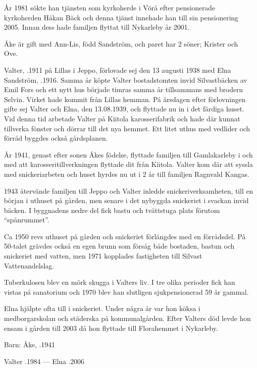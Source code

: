 År 1981 sökte han tjänsten som kyrkoherde i Vörå efter pensionerade kyrkoherden Håkan Bäck och denna tjänst innehade han till sin pensionering 2005. Innan dess hade familjen flyttat till Nykarleby år 2001.

Åke är gift med Ann-Lis, född Sandström, och paret har 2 söner;	Krister och Ove.


Valter, .1911 på Lillas i Jeppo, förlovade sej den 13 augusti 1938 med Elna Sandström, .1916. Samma år köpte Valter bostadstomten invid Silvastbäcken av Emil Fors och ett nytt hus började timras samma år tillsammans med brodern Selvin. Virket hade kommit från Lillas hemman. På årsdagen efter förlovningen gifte sej Valter och Elna, den 13.08.1939, och flyttade nu in i det färdiga huset. Vid denna tid arbetade Valter på Kiitola karosserifabrik och hade där kunnat tillverka fönster och dörrar till det nya hemmet. Ett litet uthus med vedlider och förråd byggdes också gårdsplanen.

År 1941, genast efter sonen Åkes födelse, flyttade familjen till Gamlakarleby i och med att karosseritillverkningen flyttade dit från Kiitola. Valter kom där att syssla med snickeriarbeten och huset hyrdes nu ut i 2 år till familjen Ragnvald Kangas.

1943 återvände familjen till Jeppo och Valter inledde snickeriverksamheten, till en början i uthuset på gården, men senare i det nybyggda snickeriet i svackan invid bäcken. I byggnadens nedre del fick bastu och tvättstuga plats förutom ``spånrummet''.

Ca 1950 revs uthuset på gården och snickeriet förlängdes med en förrådsdel. På 50-talet grävdes också en egen brunn som försåg både bostaden, bastun och snickeriet med vatten, men 1971 kopplades fastigheten till Silvast Vattenandelslag.

Tuberkulosen blev en mörk skugga i Valters liv. I tre olika perioder fick han vistas på sanatorium och 1970 blev han slutligen sjukpensionerad 59 år gammal.

Elna hjälpte ofta till i snickeriet. Under några år var hon köksa i medborgarskolan och städerska på kommunalgården. Efter Valters död levde hon ensam i gården till 2003 då hon flyttade till Florahemmet i Nykarleby.

Barn: Åke, .1941

Valter .1984  ---  Elna .2006




